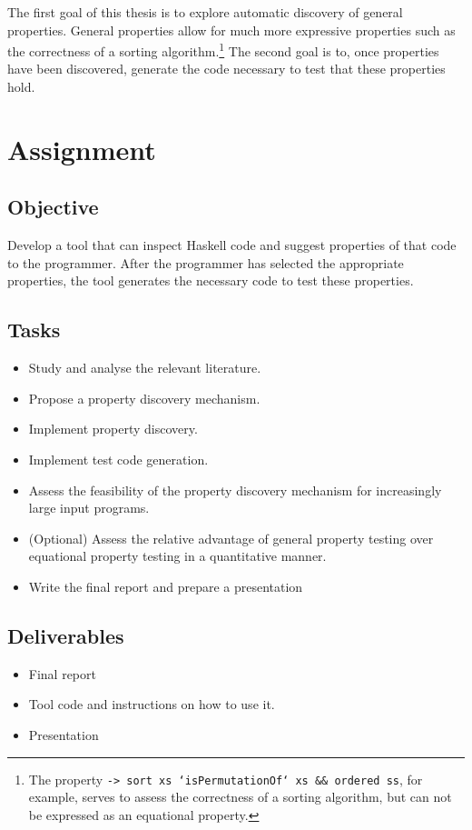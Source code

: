 \documentclass[a4paper, 11pt]{article}
\begin{document}
The first goal of this thesis is to explore automatic discovery of general properties.
General properties allow for much more expressive properties such as the correctness of a sorting algorithm.\footnote{The property \texttt{\xs -> sort xs `isPermutationOf` xs && ordered ss}, for example, serves to assess the correctness of a sorting algorithm, but can not be expressed as an equational property.}
The second goal is to, once properties have been discovered, generate the code necessary to test that these properties hold.

\newpage

\section{Assignment}
\subsection{Objective}
Develop a tool that can inspect Haskell code and suggest properties of that code to the programmer.
After the programmer has selected the appropriate properties, the tool generates the necessary code to test these properties.

\subsection{Tasks}

\begin{itemize}
    \item Study and analyse the relevant literature.
    \item Propose a property discovery mechanism.
    \item Implement property discovery.
    \item Implement test code generation.
    \item Assess the feasibility of the property discovery mechanism for increasingly large input programs.
    \item (Optional) Assess the relative advantage of general property testing over equational property testing in a quantitative manner.
    \item Write the final report and prepare a presentation
\end{itemize}


\subsection{Deliverables}

\begin{itemize}
    \item Final report
    \item Tool code and instructions on how to use it.
    \item Presentation
\end{itemize}



\end{document}
